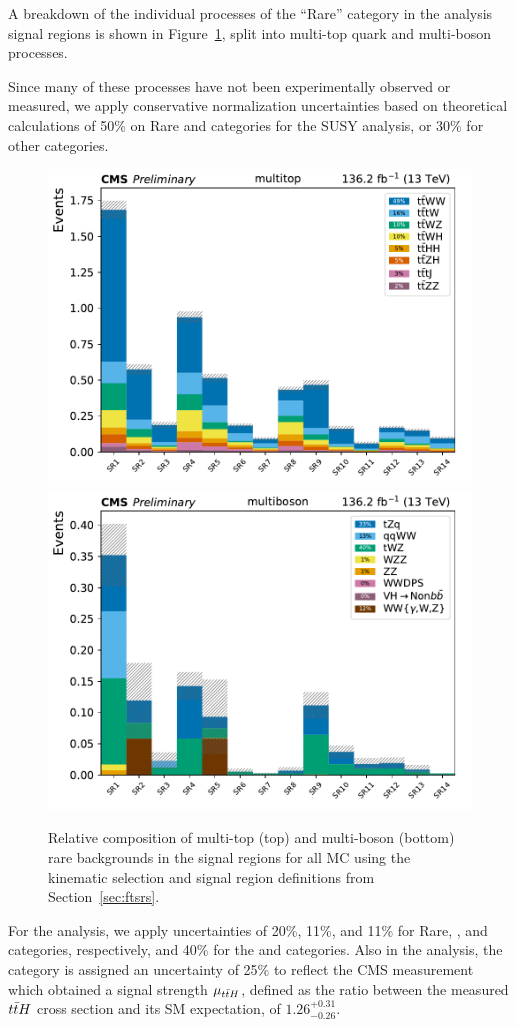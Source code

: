 A breakdown of the individual processes of the ``Rare'' category in the 
\smft analysis signal regions
is shown in Figure~\ref{fig:ftraressr}, split into multi-top quark and multi-boson
processes.

Since many of these processes have not been experimentally observed or measured,
we apply conservative normalization uncertainties based on theoretical calculations of 50\% on
Rare and \Xgamma categories for the SUSY analysis, or 30\% for other categories.

\begin{figure}[!hbtp]
    \centering
    \includegraphics[width=.60\textwidth]{figs/ftan/h_multitop.pdf} \\
    \includegraphics[width=.60\textwidth]{figs/ftan/h_multiboson.pdf}
    \caption{ Relative composition of multi-top (top) and multi-boson (bottom) rare backgrounds in the signal regions for all MC
    using the kinematic selection and signal region definitions from Section~\ref{sec:ftsrs}.
    }
    \label{fig:ftraressr}
\end{figure}

For the \smft analysis,
we apply uncertainties of 20\%, 11\%, and 11\% for Rare, \Xgamma, and \ttVV categories,
respectively, and 40\% for the \ttW and \ttZ categories. Also in the \smft analysis,
the \ttH category is assigned an uncertainty of 25\% to reflect the CMS \ttH 
measurement~\cite{CMS:Sirunyan2018hoz} which obtained a signal strength $\mu_{t\bar{t}H}$, defined
as the ratio between the measured $t\bar{t}H$ cross section and its SM expectation,
of $1.26^{+0.31}_{-0.26}$.

